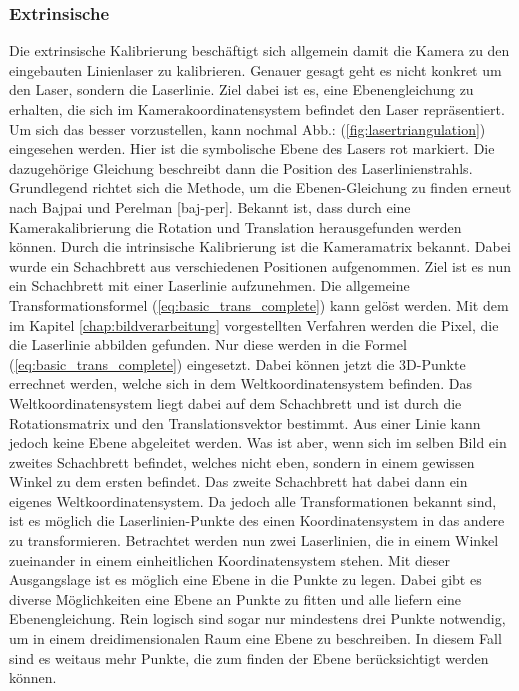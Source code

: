 		\subsubsection{Extrinsische}
		Die extrinsische Kalibrierung beschäftigt sich allgemein damit die Kamera zu den eingebauten Linienlaser zu kalibrieren. Genauer gesagt geht es nicht konkret um den Laser, sondern die Laserlinie. Ziel dabei ist es, eine Ebenengleichung zu erhalten, die sich im Kamerakoordinatensystem befindet den Laser repräsentiert. Um sich das besser vorzustellen, kann nochmal Abb.: (\ref{fig:lasertriangulation}) eingesehen werden. Hier ist die symbolische Ebene des Lasers rot markiert. Die dazugehörige Gleichung beschreibt dann die Position des Laserlinienstrahls. Grundlegend richtet sich die Methode, um die Ebenen-Gleichung zu finden erneut nach Bajpai und Perelman [baj-per]. \newline
		Bekannt ist, dass durch eine Kamerakalibrierung die Rotation und Translation herausgefunden werden können. Durch die intrinsische Kalibrierung ist die Kameramatrix bekannt. Dabei wurde ein Schachbrett aus verschiedenen Positionen aufgenommen. Ziel ist es nun ein Schachbrett mit einer Laserlinie aufzunehmen. Die allgemeine Transformationsformel (\ref{eq:basic_trans_complete}) kann gelöst werden. Mit dem im Kapitel \ref{chap:bildverarbeitung} vorgestellten Verfahren werden die Pixel, die die Laserlinie abbilden gefunden. Nur diese werden in die Formel (\ref{eq:basic_trans_complete}) eingesetzt. Dabei können jetzt die 3D-Punkte errechnet werden, welche sich in dem Weltkoordinatensystem befinden. Das Weltkoordinatensystem liegt dabei auf dem Schachbrett und ist durch die Rotationsmatrix und den Translationsvektor bestimmt. Aus einer Linie kann jedoch keine Ebene abgeleitet werden. Was ist aber, wenn sich im selben Bild ein zweites Schachbrett befindet, welches nicht eben, sondern in einem gewissen Winkel zu dem ersten befindet. Das zweite Schachbrett hat dabei dann ein eigenes Weltkoordinatensystem. Da jedoch alle Transformationen bekannt sind, ist es möglich die Laserlinien-Punkte des einen Koordinatensystem in das andere zu transformieren. Betrachtet werden nun zwei Laserlinien, die in einem Winkel zueinander in einem einheitlichen Koordinatensystem stehen. Mit dieser Ausgangslage ist es möglich eine Ebene in die Punkte zu legen. Dabei gibt es diverse Möglichkeiten eine Ebene an Punkte zu fitten und alle liefern eine Ebenengleichung. Rein logisch sind sogar nur mindestens drei Punkte notwendig, um in einem dreidimensionalen Raum eine Ebene zu beschreiben. In diesem Fall sind es weitaus mehr Punkte, die zum finden der Ebene berücksichtigt werden können. \newline
